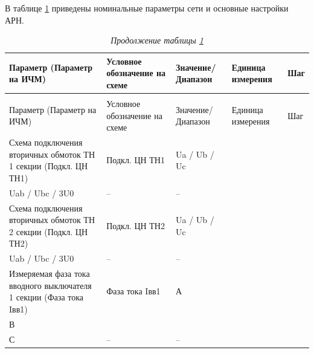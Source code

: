 \color{black}



\par
В таблице \ref{obsh:tbl1} приведены номинальные параметры сети и основные настройки АРН.

\footnotesize
\begin{longtable}{|>{\centering\arraybackslash}m{5.3cm}|>{\centering\arraybackslash}m{3.3cm}|>{\centering\arraybackslash}m{4.2cm}|>{\centering\arraybackslash}m{1.8cm}|>{\centering\arraybackslash}m{1cm}|}
\caption{Основные настройки и номинальные параметры сети\hfill\vspace{-0.5\baselineskip}}\label{obsh:tbl1}\\ 
\hline
\rowcolor{gray!30}
Параметр (Параметр на ИЧМ) & Условное обозначение на схеме & Значение/ Диапазон & Единица измерения & Шаг \\ 
\hline
\endfirsthead
\caption*{\hspace{3pt}\emph{Продолжение таблицы \ref{obsh:tbl1}\hfill\vspace{-0.5\baselineskip}}} \\ %
\hline
\rowcolor{gray!30}
Параметр (Параметр на ИЧМ) & Условное обозначение на схеме & Значение/ Диапазон & Единица измерения & Шаг \\ 
\endhead
\endfoot
\hline
\endlastfoot
\centering Схема подключения вторичных обмоток ТН 1 секции (Подкл. ЦН ТН1)  & \centering Подкл. ЦН ТН1 & \centering Ua / Ub / Uc \\ Uab / Ubc / 3U0 & \centering -- & \centering \arraybackslash -- \\
\hline
\centering Схема подключения вторичных обмоток ТН 2 секции (Подкл. ЦН ТН2)  & \centering Подкл. ЦН ТН2 & \centering Ua / Ub / Uc \\ Uab / Ubc / 3U0 & \centering -- & \centering \arraybackslash -- \\
\hline
\centering Измеряемая фаза тока вводного выключателя 1 секции (Фаза тока Iвв1)  & \centering Фаза тока Iвв1 & \centering А \\ В \\ С & \centering -- & \centering \arraybackslash -- \\

\end{longtable}
